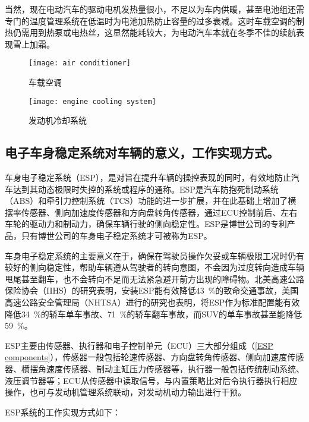 \documentclass[UTF8]{ctexart}
\numberwithin{figure}{section}
\numberwithin{table}{section}
\begin{document}
当然，现在电动汽车的驱动电机发热量很小，不足以为车内供暖，甚至电池组还需专门的温度管理系统在低温时为电池加热防止容量的过多衰减。这时车载空调的制热仍需用到热泵或电热丝，这显然能耗较大，为电动汽车本就在冬季不佳的续航表现雪上加霜。

\begin{figure}[htbp]
	\centering
	\begin{minipage}[b]{0.8\textwidth}
		\centering
		\texttt{[image: air conditioner]}
		\caption{车载空调}
		\label{air conditioner}
	\end{minipage}
	\begin{minipage}[b]{\textwidth}
		\centering
		\texttt{[image: engine cooling system]}
		\caption{发动机冷却系统}
		\label{engine cooling system}
	\end{minipage}
\end{figure}

\subsection{电子车身稳定系统对车辆的意义，工作实现方式。}

车身电子稳定系统（ESP），是对旨在提升车辆的操控表现的同时，有效地防止汽车达到其动态极限时失控的系统或程序的通称。ESP是汽车防抱死制动系统（ABS）和牵引力控制系统（TCS）功能的进一步扩展，并在此基础上增加了横摆率传感器、侧向加速度传感器和方向盘转角传感器，通过ECU控制前后、左右车轮的驱动力和制动力，确保车辆行驶的侧向稳定性。ESP是博世公司的专利产品，只有博世公司的车身电子稳定系统才可被称为ESP。

车身电子稳定系统的主要意义在于，确保在驾驶员操作欠妥或车辆极限工况时仍有较好的侧向稳定性，帮助车辆遵从驾驶者的转向意图，不会因为过度转向造成车辆甩尾甚至翻车，也不会转向不足而无法紧急避开前方出现的障碍物。北美高速公路保险协会（IIHS）的研究表明，安装ESP能有效降低\SI{43}{\percent}的致命交通事故，美国高速公路安全管理局（NHTSA）进行的研究也表明，将ESP作为标准配置能有效降低\SI{34}{\percent}的轿车单车事故、\SI{71}{\percent}的轿车翻车事故，而SUV的单车事故甚至能降低\SI{59}{\percent}。

ESP主要由传感器、执行器和电子控制单元（ECU）三大部分组成（\cref{ESP components}），传感器一般包括轮速传感器、方向盘转角传感器、侧向加速度传感器、横摆角速度传感器、制动主缸压力传感器等，执行器一般包括传统制动系统、液压调节器等；ECU从传感器中读取信号，与内置策略比对后令执行器执行相应操作，也可与发动机管理系统联动，对发动机动力输出进行干预。

ESP系统的工作实现方式如下：
\end{document}
